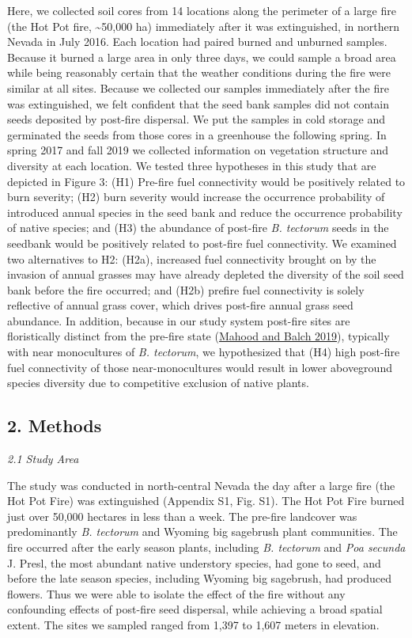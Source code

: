 \documentclass[
  12pt,
]{article}
\begin{document}
Here, we collected soil cores from 14 locations along the perimeter of a
large fire (the Hot Pot fire, \textasciitilde50,000 ha) immediately
after it was extinguished, in northern Nevada in July 2016. Each
location had paired burned and unburned samples. Because it burned a
large area in only three days, we could sample a broad area while being
reasonably certain that the weather conditions during the fire were
similar at all sites. Because we collected our samples immediately after
the fire was extinguished, we felt confident that the seed bank samples
did not contain seeds deposited by post-fire dispersal. We put the
samples in cold storage and germinated the seeds from those cores in a
greenhouse the following spring. In spring 2017 and fall 2019 we
collected information on vegetation structure and diversity at each
location. We tested three hypotheses in this study that are depicted in
Figure 3: (H1) Pre-fire fuel connectivity would be positively related to
burn severity; (H2) burn severity would increase the occurrence
probability of introduced annual species in the seed bank and reduce the
occurrence probability of native species; and (H3) the abundance of
post-fire \emph{B. tectorum} seeds in the seedbank would be positively
related to post-fire fuel connectivity. We examined two alternatives to
H2: (H2a), increased fuel connectivity brought on by the invasion of
annual grasses may have already depleted the diversity of the soil seed
bank before the fire occurred; and (H2b) prefire fuel connectivity is
solely reflective of annual grass cover, which drives post-fire annual
grass seed abundance. In addition, because in our study system post-fire
sites are floristically distinct from the pre-fire state
(\protect\hyperlink{ref-Mahood2019}{Mahood and Balch 2019}), typically
with near monocultures of \emph{B. tectorum}, we hypothesized that (H4)
high post-fire fuel connectivity of those near-monocultures would result
in lower aboveground species diversity due to competitive exclusion of
native plants.

\hypertarget{methods}{%
\subsection{2. Methods}\label{methods}}

\emph{2.1 Study Area}

The study was conducted in north-central Nevada the day after a large
fire (the Hot Pot Fire) was extinguished (Appendix S1, Fig. S1). The Hot
Pot Fire burned just over 50,000 hectares in less than a week. The
pre-fire landcover was predominantly \emph{B. tectorum} and Wyoming big
sagebrush plant communities. The fire occurred after the early season
plants, including \emph{B. tectorum} and \emph{Poa secunda} J. Presl,
the most abundant native understory species, had gone to seed, and
before the late season species, including Wyoming big sagebrush, had
produced flowers. Thus we were able to isolate the effect of the fire
without any confounding effects of post-fire seed dispersal, while
achieving a broad spatial extent. The sites we sampled ranged from 1,397
to 1,607 meters in elevation.
\end{document}
